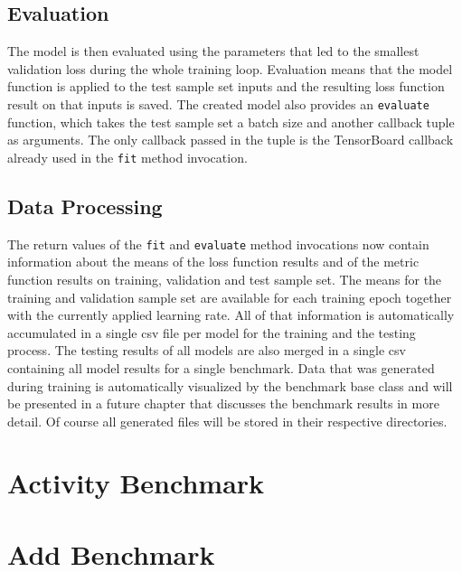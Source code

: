 \documentclass[draft,final]{vutinfth} %
\begin{document}
    \subsection{Evaluation}
    The model is then evaluated using the parameters that led to the smallest validation loss during the whole training loop.
    Evaluation means that the model function is applied to the test sample set inputs and the resulting loss function result on that inputs is saved.
    The created model also provides an \texttt{evaluate} function, which takes the test sample set a batch size and another callback tuple as arguments.
    The only callback passed in the tuple is the TensorBoard callback already used in the \texttt{fit} method invocation.
    \subsection{Data Processing}
    The return values of the \texttt{fit} and \texttt{evaluate} method invocations now contain information about the means of the loss function results and of the metric function results on training, validation and test sample set.
    The means for the training and validation sample set are available for each training epoch together with the currently applied learning rate.
    All of that information is automatically accumulated in a single csv file per model for the training and the testing process. 
    The testing results of all models are also merged in a single csv containing all model results for a single benchmark.
    Data that was generated during training is automatically visualized by the benchmark base class and will be presented in a future chapter that discusses the benchmark results in more detail.
    Of course all generated files will be stored in their respective directories.

    \section{Activity Benchmark}

    \section{Add Benchmark}
\end{document}
